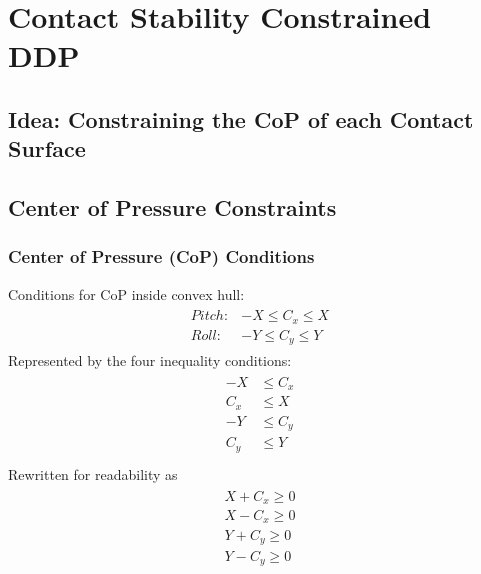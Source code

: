 
\chapter{Contact Stability Constrained DDP}\label{c3}
\section{Idea: Constraining the CoP of each Contact Surface}

\section{Center of Pressure Constraints}
\subsection{Center of Pressure (CoP) Conditions}
Conditions for \gls{CoP} inside convex hull:
\begin{align}
\begin{split}
Pitch:& -X \leq C_x \leq X \\
Roll:& -Y \leq C_y \leq Y
\end{split}
\end{align}
Represented by the four inequality conditions:
\begin{align*}
\begin{split}
-X &\leq C_x \\
C_x &\leq X \\
-Y &\leq C_y \\
C_y &\leq Y \\
\end{split}
\end{align*}
Rewritten for readability as
\begin{align}
\begin{split}
X + C_x \geq 0 \\
X - C_x \geq 0 \\
Y + C_y \geq 0 \\
Y - C_y \geq 0 \\
\end{split}
\end{align}

